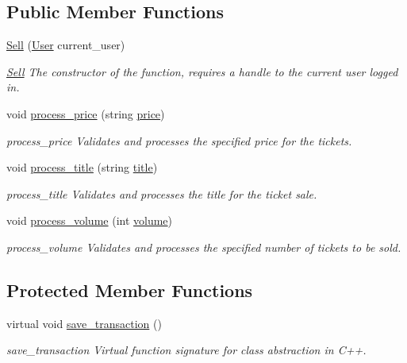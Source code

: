 \subsection*{Public Member Functions}
\begin{DoxyCompactItemize}
\item 
\hyperlink{class_sell_a63670944952b9ec10fa8aa8917f5f765}{Sell} (\hyperlink{class_user}{User} current\-\_\-user)
\begin{DoxyCompactList}\small\item\em \hyperlink{class_sell}{Sell} The constructor of the function, requires a handle to the current user logged in. \end{DoxyCompactList}\item 
void \hyperlink{class_sell_abd5f98879d9baddc5cbb17ae470f745a}{process\-\_\-price} (string \hyperlink{class_sell_a80d1e9b73edf0b6c8aa055cb5cdaa2f2}{price})
\begin{DoxyCompactList}\small\item\em process\-\_\-price Validates and processes the specified price for the tickets. \end{DoxyCompactList}\item 
void \hyperlink{class_sell_a5ba0aa4ff9dfbbb099b444497e4fbb54}{process\-\_\-title} (string \hyperlink{class_sell_a43a5eafe64b96968035e5a4013e47c75}{title})
\begin{DoxyCompactList}\small\item\em process\-\_\-title Validates and processes the title for the ticket sale. \end{DoxyCompactList}\item 
void \hyperlink{class_sell_a5ecf23192210c3fa67fd51720a6f8ab6}{process\-\_\-volume} (int \hyperlink{class_sell_aed48ca0bcd2162fd4fd495873e2631f5}{volume})
\begin{DoxyCompactList}\small\item\em process\-\_\-volume Validates and processes the specified number of tickets to be sold. \end{DoxyCompactList}\end{DoxyCompactItemize}
\subsection*{Protected Member Functions}
\begin{DoxyCompactItemize}
\item 
virtual void \hyperlink{class_sell_a8e5996ad33eb07eef44f55deba6c298e}{save\-\_\-transaction} ()
\begin{DoxyCompactList}\small\item\em save\-\_\-transaction Virtual function signature for class abstraction in C++. \end{DoxyCompactList}\end{DoxyCompactItemize}
